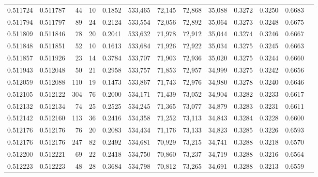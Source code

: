 \begin{tabular}{rrrrrrrrrrrrr}
0.511724 & 0.511787 &    44 &    10 &                                     0.1852 & 533,465 &  72,145 &  72,868 &  35,088 & 0.3272 & 0.3250 & 0.6683 \\
0.511794 & 0.511797 &    89 &    24 &                                     0.2124 & 533,554 &  72,056 &  72,892 &  35,064 & 0.3273 & 0.3248 & 0.6675 \\
0.511809 & 0.511846 &    78 &    20 &                                     0.2041 & 533,632 &  71,978 &  72,912 &  35,044 & 0.3274 & 0.3246 & 0.6667 \\
0.511848 & 0.511851 &    52 &    10 &                                     0.1613 & 533,684 &  71,926 &  72,922 &  35,034 & 0.3275 & 0.3245 & 0.6663 \\
0.511857 & 0.511926 &    23 &    14 &                                     0.3784 & 533,707 &  71,903 &  72,936 &  35,020 & 0.3275 & 0.3244 & 0.6660 \\
0.511943 & 0.512048 &    50 &    21 &                                     0.2958 & 533,757 &  71,853 &  72,957 &  34,999 & 0.3275 & 0.3242 & 0.6656 \\
0.512059 & 0.512088 &   110 &    19 &                                     0.1473 & 533,867 &  71,743 &  72,976 &  34,980 & 0.3278 & 0.3240 & 0.6646 \\
0.512105 & 0.512122 &   304 &    76 &                                     0.2000 & 534,171 &  71,439 &  73,052 &  34,904 & 0.3282 & 0.3233 & 0.6617 \\
0.512132 & 0.512134 &    74 &    25 &                                     0.2525 & 534,245 &  71,365 &  73,077 &  34,879 & 0.3283 & 0.3231 & 0.6611 \\
0.512142 & 0.512160 &   113 &    36 &                                     0.2416 & 534,358 &  71,252 &  73,113 &  34,843 & 0.3284 & 0.3228 & 0.6600 \\
0.512176 & 0.512176 &    76 &    20 &                                     0.2083 & 534,434 &  71,176 &  73,133 &  34,823 & 0.3285 & 0.3226 & 0.6593 \\
0.512176 & 0.512176 &   247 &    82 &                                     0.2492 & 534,681 &  70,929 &  73,215 &  34,741 & 0.3288 & 0.3218 & 0.6570 \\
0.512200 & 0.512221 &    69 &    22 &                                     0.2418 & 534,750 &  70,860 &  73,237 &  34,719 & 0.3288 & 0.3216 & 0.6564 \\
0.512223 & 0.512223 &    48 &    28 &                                     0.3684 & 534,798 &  70,812 &  73,265 &  34,691 & 0.3288 & 0.3213 & 0.6559 \\

\end{tabular}
